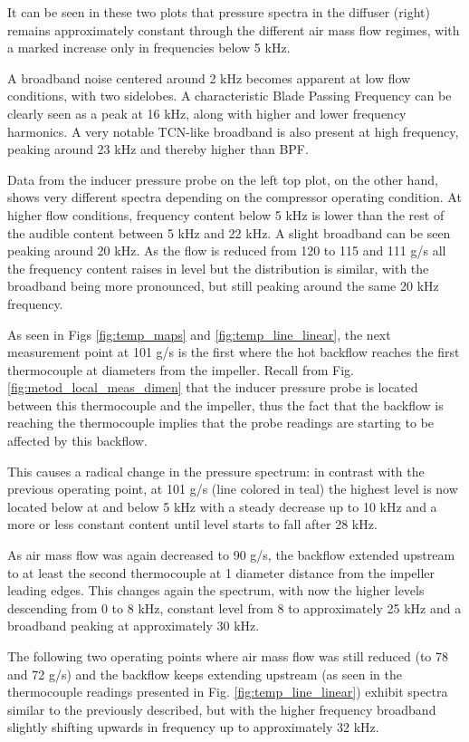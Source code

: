 It can be seen in these two plots that pressure spectra in the diffuser (right) remains approximately constant through the different air mass flow regimes, with a marked increase only in frequencies below 5 kHz.

A broadband noise centered around 2 kHz becomes apparent at low flow conditions, with two sidelobes. A characteristic Blade Passing Frequency can be clearly seen as a peak at 16 kHz, along with higher and lower frequency harmonics. A very notable TCN-like broadband is also present at high frequency, peaking around 23 kHz and thereby higher than BPF. 

Data from the inducer pressure probe on the left top plot, on the other hand, shows very different spectra depending on the compressor operating condition. At higher flow conditions, frequency content below 5 kHz is lower than the rest of the audible content between 5 kHz and 22 kHz. A slight broadband can be seen peaking around 20 kHz. As the flow is reduced from 120 to 115 and 111 g/s all the frequency content raises in level but the distribution is similar, with the broadband being more pronounced, but still peaking around the same 20 kHz frequency.

As seen in Figs \ref{fig:temp_maps} and \ref{fig:temp_line_linear}, the next measurement point at 101 g/s is the first where the hot backflow reaches the first thermocouple at  diameters from the impeller. Recall from Fig. \ref{fig:metod_local_meas_dimen} that the inducer pressure probe is located between this thermocouple and the impeller, thus the fact that the backflow is reaching the thermocouple implies that the probe readings are starting to be affected by this backflow.

This causes a radical change in the pressure spectrum: in contrast with the previous operating point, at 101 g/s (line colored in teal) the highest level is now located below at and below 5 kHz with a steady decrease up to 10 kHz and a more or less constant content until level starts to fall after 28 kHz.

As air mass flow was again decreased to 90 g/s, the backflow extended upstream to at least the second thermocouple at 1 diameter distance from the impeller leading edges. This changes again the spectrum, with now the higher levels descending from 0 to 8 kHz, constant level from 8 to approximately 25 kHz and a broadband peaking at approximately 30 kHz.

The following two operating points where air mass flow was still reduced (to 78 and 72 g/s) and the backflow keeps extending upstream (as seen in the thermocouple readings presented in Fig. \ref{fig:temp_line_linear}) exhibit spectra similar to the previously described, but with the higher frequency broadband slightly shifting upwards in frequency up to approximately 32 kHz.

